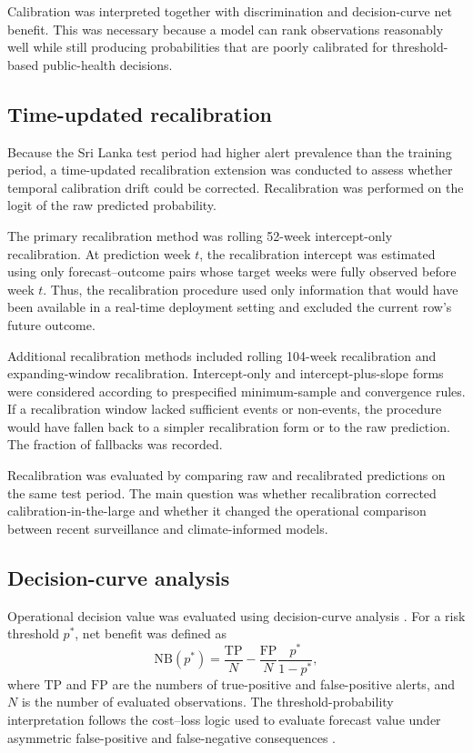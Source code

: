 \documentclass[11pt,a4paper]{article}
\begin{document}
Calibration was interpreted together with discrimination and decision-curve net benefit. This was necessary because a model can rank observations reasonably well while still producing probabilities that are poorly calibrated for threshold-based public-health decisions.

\subsection{Time-updated recalibration}
\label{subsec:time-updated-recalibration}

Because the Sri Lanka test period had higher alert prevalence than the training period, a time-updated recalibration extension was conducted to assess whether temporal calibration drift could be corrected. Recalibration was performed on the logit of the raw predicted probability.

The primary recalibration method was rolling 52-week intercept-only recalibration. At prediction week $t$, the recalibration intercept was estimated using only forecast--outcome pairs whose target weeks were fully observed before week $t$. Thus, the recalibration procedure used only information that would have been available in a real-time deployment setting and excluded the current row's future outcome.

Additional recalibration methods included rolling 104-week recalibration and expanding-window recalibration. Intercept-only and intercept-plus-slope forms were considered according to prespecified minimum-sample and convergence rules. If a recalibration window lacked sufficient events or non-events, the procedure would have fallen back to a simpler recalibration form or to the raw prediction. The fraction of fallbacks was recorded.

Recalibration was evaluated by comparing raw and recalibrated predictions on the same test period. The main question was whether recalibration corrected calibration-in-the-large and whether it changed the operational comparison between recent surveillance and climate-informed models.

\subsection{Decision-curve analysis}
\label{subsec:decision-curve-analysis}

Operational decision value was evaluated using decision-curve analysis \citep{Vickers2006}. For a risk threshold $p^*$, net benefit was defined as
\[
\mathrm{NB}(p^*)
=
\frac{\mathrm{TP}}{N}
-
\frac{\mathrm{FP}}{N}
\frac{p^*}{1-p^*},
\]
where $\mathrm{TP}$ and $\mathrm{FP}$ are the numbers of true-positive and false-positive alerts, and $N$ is the number of evaluated observations. The threshold-probability interpretation follows the cost--loss logic used to evaluate forecast
value under asymmetric false-positive and false-negative consequences \citep{Murphy1985,Tozan2023}.
\end{document}
